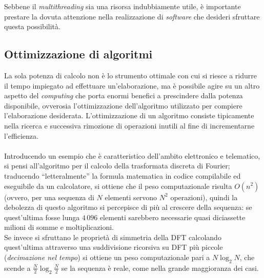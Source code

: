 Sebbene il \emph{multithreading} sia una risorsa indubbiamente utile, è
importante prestare la dovuta attenzione nella realizzazione di \emph{software}
che desideri sfruttare questa possibilità.

\subsection{Ottimizzazione di algoritmi}

La sola potenza di calcolo %
non è lo strumento ottimale con cui si riesce a
ridurre il tempo impiegato ad effettuare un'elaborazione, ma è possibile agire
su un altro aspetto del \emph{computing} che porta enormi benefici a prescindere
dalla potenza disponibile, ovverosia l'ottimizzazione dell'algoritmo utilizzato
per compiere l'elaborazione desiderata.
L'ottimizzazione di un algoritmo consiste tipicamente nella ricerca e 
successiva rimozione di operazioni inutili al fine di incrementarne 
l'efficienza.
\\ \\ 
Introducendo un esempio che è caratteristico dell'ambito elettronico e
telematico, si pensi all'algoritmo per il calcolo della trasformata discreta
di Fourier; traducendo ``letteralmente'' la formula matematica in codice
compilabile ed eseguibile da un calcolatore, si ottiene che il peso
computazionale risulta $O(n^2)$ (ovvero, per una sequenza di $N$ 
elementi servono $N^2$ operazioni), quindi la debolezza di questo algoritmo 
si percepisce di più al crescere della sequenza: %
 se quest'ultima fosse lunga $4\,096$ elementi sarebbero necessarie quasi 
 diciassette milioni di somme e moltiplicazioni. \\
Se invece si sfruttano le proprietà di simmetria della DFT calcolando 
quest'ultima attraverso una suddivisione ricorsiva su DFT più piccole 
(\emph{decimazione nel tempo}) si ottiene un peso computazionale pari a 
$N\log_{2}N$, che scende a $\frac{N}{2}\log_{2}\frac{N}{2}$ se la sequenza è 
reale, %
come nella grande maggioranza dei casi. %
